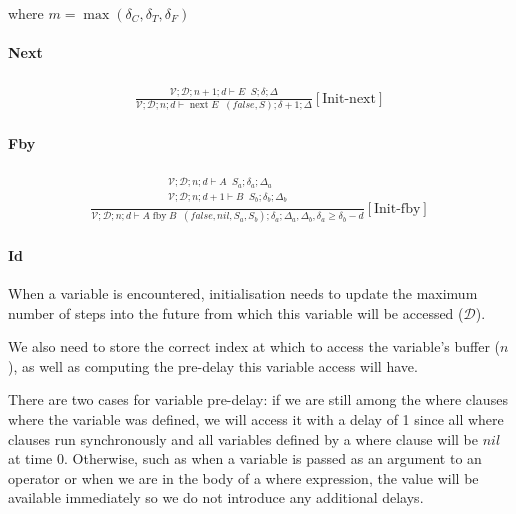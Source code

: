 \documentclass{scrartcl}
\DeclareMathOperator{\fby}{fby}
\DeclareMathOperator{\nextop}{next}
\DeclareMathOperator{\initrel}{\overset{init}{\Rightarrow}}
\begin{document}
    where $m = \max(\delta_C, \delta_T, \delta_F)$
    
    \paragraph{Next}
    
    \begin{align*}
    \frac{
        \begin{matrix}
        \mathcal{V}; \mathcal{D}; n+1; d \vdash E \initrel S; \delta; \Delta
        \end{matrix}
    }{
        \mathcal{V}; \mathcal{D}; n; d \vdash \nextop E \initrel (false, S); \delta+1; \Delta
    }[\text{Init-next}]
    \end{align*}
    
    \paragraph{Fby}
    
    \begin{align*}
    \frac{
        \begin{matrix}
        \mathcal{V}; \mathcal{D}; n; d \vdash A \initrel S_a; \delta_a; \Delta_a \\
        \mathcal{V}; \mathcal{D}; n; d+1 \vdash B \initrel S_b; \delta_b; \Delta_b \\
        \end{matrix}
    }{
        \mathcal{V}; \mathcal{D}; n; d \vdash A \fby B \initrel (false, nil, S_a, S_b); \delta_a; \Delta_a, \Delta_b, \delta_a \geq \delta_b - d
    }[\text{Init-fby}]
    \end{align*}
    
    \paragraph{Id}
    
    When a variable is encountered, initialisation needs to update the maximum number of steps into the future from which this variable will be accessed ($\mathcal{D}$).
    
    We also need to store the correct index at which to access the variable's buffer ($n$), as well as computing the pre-delay this variable access will have.
    
    There are two cases for variable pre-delay: if we are still among the where clauses where the variable was defined, we will access it with a delay of 1 since all where clauses run synchronously and all variables defined by a where clause will be $nil$ at time 0. Otherwise, such as when a variable is passed as an argument to an operator or when we are in the body of a where expression, the value will be available immediately so we do not introduce any additional delays.
    
\end{document}
